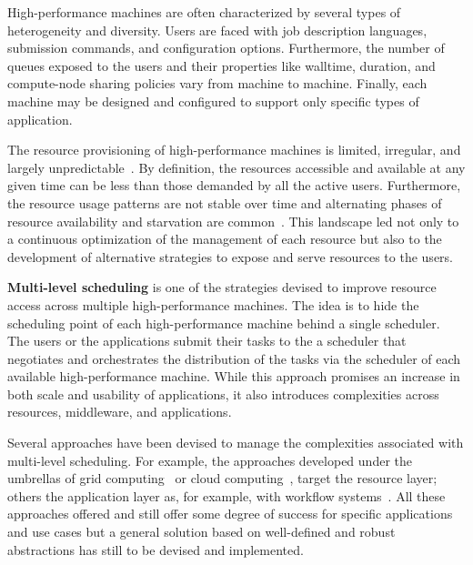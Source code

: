 \documentclass{sig-alternate}
\begin{document}
High-performance machines are often characterized by several types of
heterogeneity and diversity. Users are faced with job description languages,
submission commands, and configuration options. Furthermore, the number of
queues exposed to the users and their properties like walltime, duration, and
compute-node sharing policies vary from machine to machine. Finally, each
machine may be designed and configured to support only specific types of
application.

The resource provisioning of high-performance machines is limited, irregular,
and largely unpredictable~\cite{downey1997,wolski2003,li2004,tsafrir2007}. By
definition, the resources accessible and available at any given time can be less
than those demanded by all the active users. Furthermore, the resource usage
patterns are not stable over time and alternating phases of resource
availability and starvation are common~\cite{Furlani2013,Lu2013}. This landscape
led not only to a continuous optimization of the management of each resource but
also to the development of alternative strategies to expose and serve resources
to the users.


{\bf Multi-level scheduling} is one of the strategies devised to improve
resource access across multiple high-performance machines. The idea is to hide
the scheduling point of each high-performance machine behind a single scheduler.
The users or the applications submit their tasks to the a scheduler that
negotiates and orchestrates the distribution of the tasks via the scheduler of
each available high-performance machine. While this approach promises an
increase in both scale and usability of applications, it also introduces
complexities across resources, middleware, and applications.


Several approaches have been devised to manage the complexities associated with
multi-level scheduling. For example, the approaches developed under the
umbrellas of grid computing~\cite{raicu2007,singh2005,ramakrishnan2006toward} or
cloud computing~\cite{foster2008,juve2008,villegas2012,song2009}, target the
resource layer; others the application layer as, for example, with workflow
systems~\cite{taylor2014,curcin2008scientific,juve2008,balderrama2012scalable}.
All these approaches offered and still offer some degree of success for specific
applications and use cases but a general solution based on well-defined and
robust abstractions has still to be devised and implemented.
\end{document}
